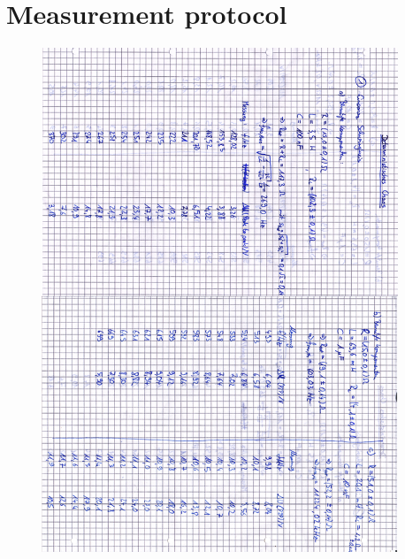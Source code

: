 \clearpage
\appendix
\section{Measurement protocol}

\begin{figure}[H]
\centering \includegraphics[width=0.95\textwidth]{Bilder/anh1.png}
\end{figure}

